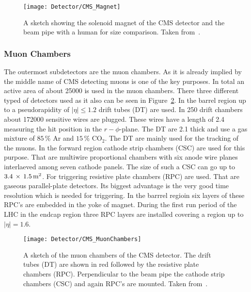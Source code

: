 \begin{figure}[!Hhtb]
  \centering
  \texttt{[image: Detector/CMS\_Magnet]}
  \caption[Sketch of the solenoid magnet]{A sketch showing the solenoid magnet of the CMS detector and the beam pipe with a human for size comparison. Taken from~. \label{plot:LHCCMSMagnetCMS}}
\end{figure}

\subsubsection{Muon Chambers}

The outermost subdetectors are the muon chambers. As it is already implied by the middle name of CMS detecting muons is one of the key purposes. In total an active area of about 25000\ms{} is used in the muon chambers. There three different typed of detectors used as it also can be seen in Figure~\ref{plot:LHCCMSMuonChambersCMS}. In the barrel region up to a pseudorapidity of $\left|\eta{}\right| \leq{} 1.2$ drift tubes (DT) are used. In 250 drift chambers about 172000 sensitive wires are plugged. These wires have a length of 2.4\m{} measuring the hit position in the $r-\phi{}$-plane. The DT are 2.1\cm{} thick and use a gas mixture of $85\,\%$ Ar and $15\,\%$ $\text{CO}_{\text{2}}$. The DT are mainly used for the tracking of the muons. In the forward region cathode strip chambers (CSC) are used for this purpose. That are multiwire proportional chambers with six anode wire planes interlaeved among seven cathode panels. The size of such a CSC can go up to $3.4\,\times{}\,1.5\,\text{m}^{\text{2}}{}$. For triggering resistive plate chambers (RPC) are used. That are gaseous parallel-plate detectors. Its biggest advantage is the very good time resolution which is needed for triggering. In the barrrel regioin six layers of these RPC's are embedded in the yoke of magnet. During the first run period of the LHC in the endcap region three RPC layers are installed covering a region up to $\left|\eta{}\right| = 1.6$.

\begin{figure}[!Hhtb]
  \centering
  \texttt{[image: Detector/CMS\_MuonChambers]}
  \caption[Sketch of the muon chambers of CMS]{A sketch of the muon chambers of the CMS detector. The drift tubes (DT) are shown in red followed by the resistive plate chambers (RPC). Perpendicular to the beam pipe the cathode strip chambers (CSC) and again RPC's are mounted. Taken from~. \label{plot:LHCCMSMuonChambersCMS}}
\end{figure}


